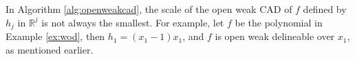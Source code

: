 \documentclass[amsthm]{elsart}
\def \Bproj  {{\tt Bp}}
\def  \Hproj {{\tt Hp}}
\def \Bprojection {{\tt Bproj}}
\def \RR {{\mathbb R}}
\begin{document}
\begin{rem}
In Algorithm \ref{alg:openweakcad}, the scale of the open weak CAD of $f$ defined by $h_j$ in $\RR^j$ is not always the smallest. For example, let $f$ be the polynomial in Example \ref{ex:wod}, then $h_1=(x_1-1)x_1$, and $f$ is open weak delineable over $x_1$, as mentioned earlier.
\end{rem}



\begin{comment}
It is clear that $\Hproj(f,[x_{n},\ldots,x_i])| \Bproj(f,[x_{n},\ldots,x_i]),$ from definition, each polynomial of $\overline{\Hproj}(f,n)$ is a factor of at least one polynomial of $\Bprojection(f)$ (see Algorithm \ref{Bproj}). Figure \ref{fig:3} is the graph of Example \ref{ex:1} with $\Hproj$. Thus the projection scale is reduced. By definition, the polynomial $\Hproj(f,[x_{n},\ldots,x_i)]$ in the projection set of $\overline{\Hproj}(f,i)$ is independent with the projection orders of $x_1,\ldots,x_i$.
We proved that, in terms of the $\Hproj$, at least one sample point can be taken from every highest dimensional cell via the Refined Open CAD lifting phase. Therefore, we provided an improved CAD projection operator for explicit description of solution sets of systems of strict polynomial inequalities, correct up to lower dimensional algebraic sets.
\end{comment}
\end{document}
